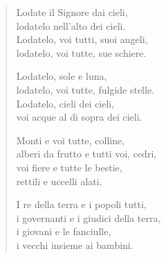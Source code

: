 \documentclass[11pt]{book}
\begin{document}
\vspace{\baselineskip}
\renewcommand{\versettosalmo}{Lodiamo insieme il nome del Signore}
\noindent{}

\noindent\rispostasalmo

\nobreak
\begin{verse}
Lodate il Signore dai cieli,\\
lodatelo nell'alto dei cieli.\\
Lodatelo, voi tutti, suoi angeli,\\
lodatelo, voi tutte, sue schiere.\\
\rispostasalmo

Lodatelo, sole e luna,\\
lodatelo, voi tutte, fulgide stelle.\\
Lodatelo, cieli dei cieli,\\
voi acque al di sopra dei cieli.\\
\rispostasalmo

Monti e voi tutte, colline,\\
alberi da frutto e tutti voi, cedri,\\
voi fiere e tutte le bestie,\\
rettili e uccelli alati.\\
\rispostasalmo

\pagebreak
I re della terra e i popoli tutti,\\
i governanti e i giudici della terra,\\
i giovani e le fanciulle,\\
i vecchi insieme ai bambini.\\
\rispostasalmo
\end{verse}
\end{document}
